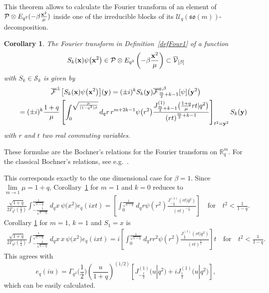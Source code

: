 \documentclass[11pt]{article}
\newtheorem{corollary}{Corollary}
\newcommand{\mR}{\mathbb{R}}
\newcommand{\cF}{\mathcal{F}}
\newcommand{\cP}{\mathcal{P}}
\newcommand{\cS}{\mathcal{S}}
\newcommand{\cV}{\mathcal{V}}
\newcommand{\cU}{\mathcal{U}}
\numberwithin{equation}{section}
\begin{document}
This theorem allows to calculate the Fourier transform of an element of $\cP\otimes E_{q^2}(-\beta \frac{\bold{x}^2}{\mu})$ inside one of the irreducible blocks of its $\cU_q(\mathfrak{so}(m))$-decomposition.
\begin{corollary}
\label{BochFour}
The Fourier transform in Definition~{\rm \ref{defFour1}} of a function
\[
S_k(\bold{x})\psi\big(\bold{x}^2\big)\in\cP\otimes E_{q^2}\left(-\beta \frac{\bold{x}^2}{\mu}\right)\subset \overline{\cV}_{[\beta]}
\]
 with $S_k\in\cS_k$ is given by
\begin{gather*}
\overline{\cF}^\pm\big[S_k(\bold{x})\psi\big(\bold{x}^2\big)\big](\bold{y}) = (\pm i)^kS_k(\bold{y})\overline{\cF}^{q,\beta}_{\frac{m}{2}+k-1}[\psi]\big(\bold{y}^2\big)\\
\qquad{}  = (\pm i)^k\frac{1+q}{\mu}\left[\int_{0}^{\sqrt{\frac{\mu}{(1-q^2)\beta}}}d_qr \,r^{m+2k-1}\psi\big(r^2\big)\frac{J^{(1)}_{\frac{m}{2}+k-1}\big(\frac{1+q}{\mu}rt|q^2\big)}{\left(rt\right)^{\frac{m}{2}+k-1}}
\right]_{t^2=\bold{y}^2}S_k(\bold{y})
\end{gather*}
with $r$ and $t$ two real commuting variables.
\end{corollary}

These formulae are the Bochner's relations for the Fourier transform on $\mR^m_q$. For the classical Bochner's relations, see e.g.~\cite{MR1151617}.

This corresponds exactly to the one dimensional case for $\beta=1$. Since $\lim\limits_{m\to1}\mu=1+q$, Corollary~\ref{BochFour} for $m=1$ and $k=0$ reduces to
\begin{gather*}
\frac{\sqrt{1+q}}{2\Gamma_{q^2}(\frac{1}{2})}\int_{-\frac{1}{\sqrt{1-q}}}^{\frac{1}{\sqrt{1-q}}}d_qx\,\psi\big(x^2\big)e_q(ixt) = \left[\int_{0}^{\frac{1}{\sqrt{1-q}}}d_qr \psi(r^2)\frac{J^{(1)}_{-\frac{1}{2}}(rt|q^2)}{(rt)^{-\frac{1}{2}}}\right] \quad\mbox{for}\quad t^2<\frac{1}{1-q}.
\end{gather*}
Corollary \ref{BochFour} for $m=1$, $k=1$ and $S_1=x$ is
\begin{gather*}
\frac{\sqrt{1+q}}{2\Gamma_{q^2}(\frac{1}{2})}\int_{-\frac{1}{\sqrt{1-q}}}^{\frac{1}{\sqrt{1-q}}}d_qx\,x\,\psi\big(x^2\big)e_q(ixt) = i\left[ \! \int_{0}^{\frac{1}{\sqrt{1-q}}} \!\!d_qrr^2 \psi(r^2)\frac{J^{(1)}_{\frac{1}{2}} (rt|q^2 )}{(rt)^{\frac{1}{2}}}\right]t
\quad \mbox{for}\quad t^2<\frac{1}{1-q}.
\end{gather*}
This agrees with
\[
e_q(iu)=\Gamma_{q^2}\Big(\frac{1}{2}\Big)\left(\frac{u}{1+q}\right)^{(1/2)}\left[J_{-\frac{1}{2}}^{(1)}\big(u|q^2\big)
+iJ_{\frac{1}{2}}^{(1)}\big(u|q^2\big)\right],
 \]
 which can be easily calculated.
\end{document}
